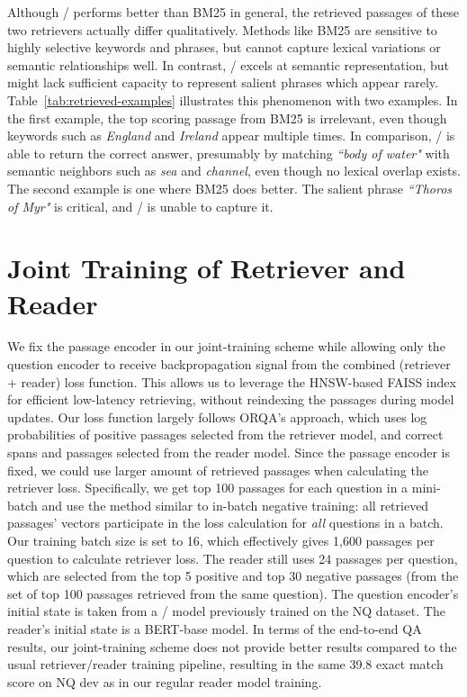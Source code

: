 Although \model/ performs better than BM25 in general, the retrieved passages of these two retrievers actually differ qualitatively. Methods like BM25 are sensitive to highly selective keywords and phrases, but cannot capture lexical variations or semantic relationships well.  In contrast, \model/ excels at semantic representation, but might lack sufficient capacity to represent salient phrases which appear rarely.  Table~\ref{tab:retrieved-examples} illustrates this phenomenon with two examples.  In the first example, the top scoring passage from BM25 is irrelevant, even though keywords such as \textit{England} and \textit{Ireland} appear multiple times.  In comparison, \model/ is able to return the correct answer, presumably by matching \textit{``body of water"} with semantic neighbors such as \textit{sea} and \textit{channel}, even though no lexical overlap exists.
The second example is one where BM25 does better.  The salient phrase \textit{``Thoros of Myr"} is critical, and \model/ is unable to capture it.







\section{Joint Training of Retriever and Reader}
\label{sec:joint}

We fix the passage encoder in our joint-training scheme while allowing only the question encoder to receive backpropagation signal from the combined (retriever + reader) loss function.
This allows us to leverage the HNSW-based FAISS index for efficient low-latency retrieving, without reindexing the passages during model updates.
Our loss function largely follows ORQA's approach, which uses log probabilities of positive passages selected from the retriever model, and correct spans and passages selected from the reader model.
Since the passage encoder is fixed, we could use larger amount of retrieved passages when calculating the retriever loss.
Specifically, we get top 100 passages for each question in a mini-batch and use the method similar to in-batch negative training: all retrieved passages' vectors participate in the loss calculation for \emph{all} questions in a batch. 
Our training batch size is set to 16, which effectively gives 1,600 passages per question to calculate retriever loss.
The reader still uses 24 passages per question, which are selected from the top 5 positive and top 30 negative passages (from the set of top 100 passages retrieved from the same question).
The question encoder's initial state is taken from a \model/ model previously trained on the NQ dataset.
The reader's initial state is a BERT-base model.
In terms of the end-to-end QA results, our joint-training scheme does not provide better results compared to the usual retriever/reader training pipeline, resulting in the same 39.8 exact match score on NQ dev as in our regular reader model training.






